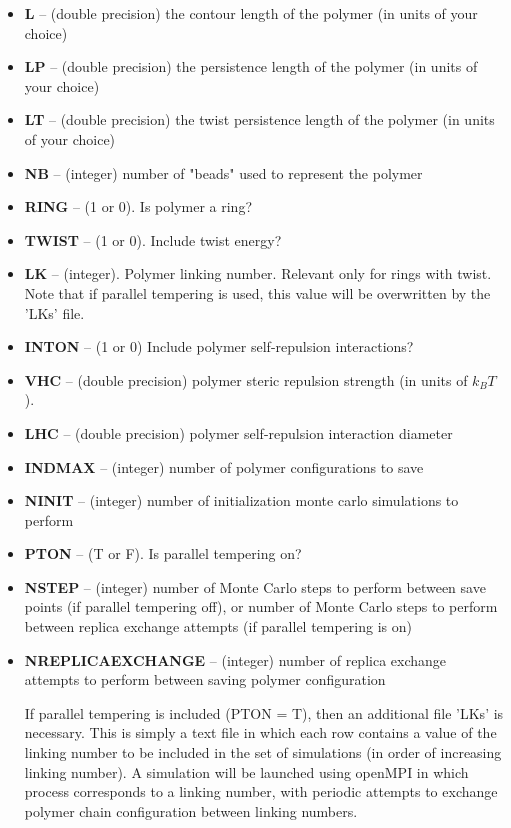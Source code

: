 \documentclass[english]{article}
\begin{document}
\begin{itemize}
\item \textbf{L} -- (double precision) the contour length of the polymer (in units of your choice)
\item \textbf{LP} -- (double precision) the persistence length of the polymer (in units of your choice)
\item \textbf{LT} -- (double precision) the twist persistence length of the polymer (in units of your choice)
\item \textbf{NB} -- (integer) number of "beads" used to represent the polymer 
\item \textbf{RING} -- (1 or 0). Is polymer a ring?
\item \textbf{TWIST} -- (1 or 0). Include twist energy?
\item \textbf{LK} -- (integer). Polymer linking number. Relevant only for rings with twist. Note that if parallel tempering is used, this value will be overwritten by the 'LKs' file.
\item \textbf{INTON} -- (1 or 0) Include polymer self-repulsion interactions?
\item \textbf{VHC}   -- (double precision) polymer steric repulsion strength (in units of $k_BT$).
\item \textbf{LHC} -- (double precision) polymer self-repulsion interaction diameter
\item \textbf{INDMAX} -- (integer) number of polymer configurations to save
\item \textbf{NINIT} -- (integer) number of initialization monte carlo simulations to perform
\item \textbf{PTON}  -- (T or F). Is parallel tempering on?
\item \textbf{NSTEP} -- (integer) number of Monte Carlo steps to perform between save points (if parallel tempering off), or number of Monte Carlo steps to perform between replica exchange attempts (if parallel tempering is on)
\item \textbf{NREPLICAEXCHANGE} -- (integer) number of replica exchange attempts to perform between saving polymer configuration

If parallel tempering is included (PTON = T), then an additional file 'LKs' is necessary. This is simply a text file in which each row contains a value of the linking number to be included in the set of simulations (in order of increasing linking number). A simulation will be launched using openMPI in which process corresponds to a linking number, with periodic attempts to exchange polymer chain configuration between linking numbers.


\end{itemize}
\end{document}
